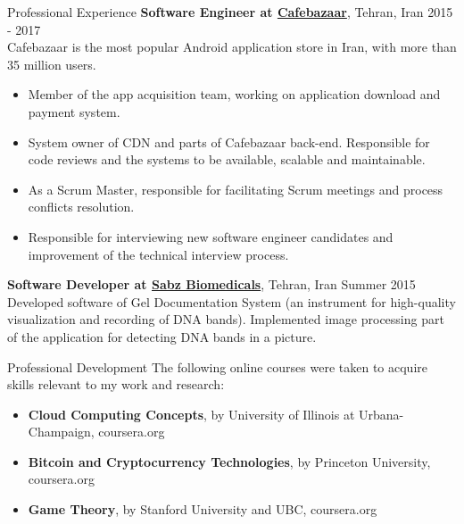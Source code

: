 \documentclass{resume} %
\begin{document}
\begin{rSection}{Professional Experience}
	{\bf Software Engineer at \href{https://cafebazaar.ir/}{Cafebazaar}}, Tehran, Iran \hfill 2015 - 2017
	\\ Cafebazaar is the most popular Android application store in Iran, with more than 35 million users.
	\begin{itemize}
		\item Member of the app acquisition team, working on application download and payment system.
		\item System owner of CDN and parts of Cafebazaar back-end. Responsible for code reviews and the systems to be available, scalable and maintainable.
		\item As a Scrum Master, responsible for facilitating Scrum meetings and process conflicts resolution.
		\item Responsible for interviewing new software engineer candidates and improvement of the technical interview process.
	\end{itemize}
	
	{\bf Software Developer at \href{http://www.sabzgroup.com/}{Sabz Biomedicals}}, Tehran, Iran \hfill Summer 2015
	\\Developed software of Gel Documentation System (an instrument for high-quality visualization and recording of DNA bands). Implemented image processing part of the application for detecting DNA bands in a picture.
\end{rSection}


\begin{rSection}{Professional Development}
	The following online courses were taken to acquire skills relevant to my work and research:
	\begin{itemize}
		\item {\bf Cloud Computing Concepts}, by University of Illinois at Urbana-Champaign, coursera.org
		\item {\bf Bitcoin and Cryptocurrency Technologies}, by Princeton University, coursera.org
		\item {\bf Game Theory}, by Stanford University and UBC, coursera.org
	\end{itemize}
\end{rSection}
\end{document}
